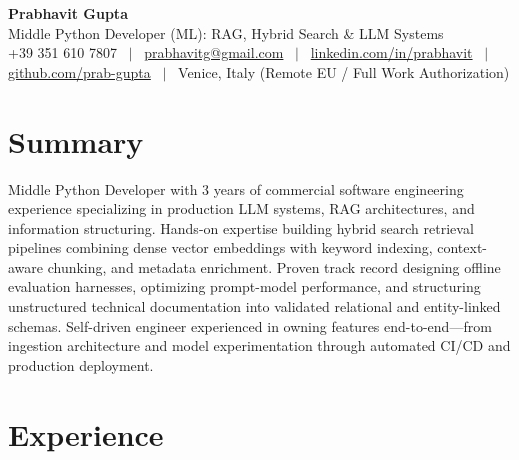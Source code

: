 \documentclass[a4paper,10pt]{article}
\begin{document}
\begin{minipage}[c]{0.80\textwidth}
 {\Huge\bfseries Prabhavit Gupta}\\[3pt]
 {\color{accent}\large Middle Python Developer (ML): RAG, Hybrid Search \& LLM Systems}\\[6pt]
 {\footnotesize +39 351 610 7807 ~$\vert$~
 \href{mailto:prabhavitg@gmail.com}{prabhavitg@gmail.com} ~$\vert$~
 \href{https://www.linkedin.com/in/prabhavit/}{linkedin.com/in/prabhavit} ~$\vert$~
 \href{https://github.com/prab-gupta}{github.com/prab-gupta} ~$\vert$~
 Venice, Italy (Remote EU / Full Work Authorization)}
\end{minipage}\hfill

\section{Summary}
Middle Python Developer with 3 years of commercial software engineering experience specializing in production LLM systems, RAG architectures, and information structuring. Hands-on expertise building hybrid search retrieval pipelines combining dense vector embeddings with keyword indexing, context-aware chunking, and metadata enrichment. Proven track record designing offline evaluation harnesses, optimizing prompt-model performance, and structuring unstructured technical documentation into validated relational and entity-linked schemas. Self-driven engineer experienced in owning features end-to-end---from ingestion architecture and model experimentation through automated CI/CD and production deployment.

\section{Experience}
\end{document}
